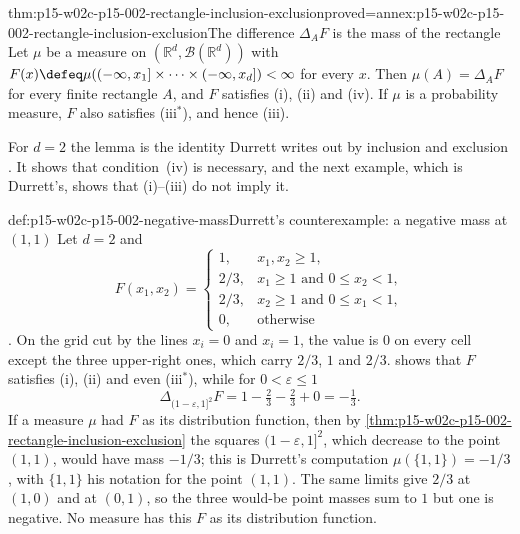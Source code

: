 \begin{hblemma}{thm:p15-w02c-p15-002-rectangle-inclusion-exclusion}{proved=annex:p15-w02c-p15-002-rectangle-inclusion-exclusion}{The difference \(\Delta_AF\) is the mass of the rectangle}
Let \(\mu\) be a measure on \((\mathbb R^d,\mathcal B(\mathbb R^d))\) with
\(F(x)\defeq\mu((-\infty,x_1]\times\cdots\times(-\infty,x_d])<\infty\) for
every \(x\). Then \(\mu(A)=\Delta_AF\) for every finite rectangle \(A\),
and \(F\) satisfies (i), (ii) and (iv). If \(\mu\) is a probability
measure, \(F\) also satisfies (iii\(^*\)), and hence (iii).
\end{hblemma}

For \(d=2\) the lemma is the identity Durrett writes out by inclusion and
exclusion \cite[p.~7]{DurrettPTEAuthor2019}. It shows that condition~(iv)
is necessary, and the next example, which is Durrett's, shows that
(i)--(iii) do not imply it.

\begin{hbexample}{def:p15-w02c-p15-002-negative-mass}{Durrett's counterexample: a negative mass at \((1,1)\)}
Let \(d=2\) and
\[
 F(x_1,x_2)=
 \begin{cases}
  1,&x_1,x_2\geq1,\\
  2/3,&x_1\geq1\text{ and }0\leq x_2<1,\\
  2/3,&x_2\geq1\text{ and }0\leq x_1<1,\\
  0,&\text{otherwise}
 \end{cases}
\]
\cite[p.~6]{DurrettPTEAuthor2019}. On the grid cut by the lines
\(x_i=0\) and \(x_i=1\), the value is \(0\) on every cell except the three
upper-right ones, which carry \(2/3\), \(1\) and \(2/3\).
 shows that \(F\) satisfies
(i), (ii) and even (iii\(^*\)), while for \(0<\varepsilon\leq1\)
\[
 \Delta_{(1-\varepsilon,1]^2}F=1-\tfrac23-\tfrac23+0=-\tfrac13 .
\]
If a measure \(\mu\) had \(F\) as its distribution function, then by
\cref{thm:p15-w02c-p15-002-rectangle-inclusion-exclusion} the squares
\((1-\varepsilon,1]^2\), which decrease to the point \((1,1)\), would have
mass \(-1/3\); this is Durrett's computation
\(\mu(\{1,1\})=-1/3\), with \(\{1,1\}\) his notation for the point
\((1,1)\). The same limits give \(2/3\) at \((1,0)\) and at \((0,1)\),
so the three would-be point masses sum to \(1\) but one is negative. No
measure has this \(F\) as its distribution function.
\end{hbexample}

